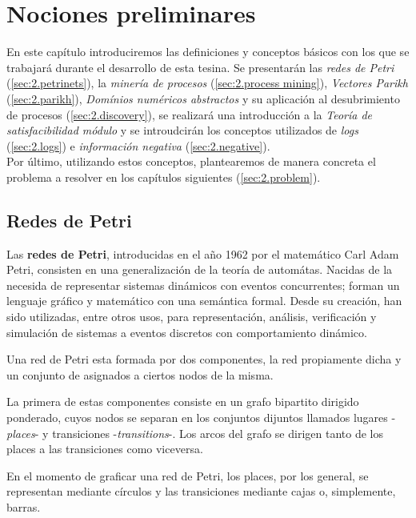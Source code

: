\chapter[Nociones preliminares]{Nociones preliminares}
\label{chap:2}

En este capítulo introduciremos las definiciones y conceptos básicos con los que se trabajará durante el desarrollo de 
esta tesina. Se presentarán las \textit{redes de Petri} (\autoref{sec:2.petrinets}), la \textit{minería de procesos} 
(\autoref{sec:2.process mining}), \textit{Vectores Parikh} (\autoref{sec:2.parikh}), \textit{Domínios numéricos abstractos}
y su aplicación al desubrimiento de procesos (\autoref{sec:2.discovery}), se realizará una introducción 
a la \textit{Teoría de satisfacibilidad módulo} y se introudcirán los conceptos utilizados de 
\textit{logs} (\autoref{sec:2.logs}) e \textit{información negativa} (\autoref{sec:2.negative}).
\\

Por último, utilizando estos conceptos, plantearemos de manera concreta el problema a resolver en los capítulos siguientes (\autoref{sec:2.problem}).

\section{Redes de Petri}
\label{sec:2.petrinets}
Las \textbf{redes de Petri}, introducidas en el año 1962 por el matemático
Carl Adam Petri, consisten en una generalización de la teoría de automátas.
Nacidas de la necesida de representar sistemas dinámicos con eventos concurrentes;
forman un lenguaje gráfico y matemático con una semántica formal.
Desde su creación, han sido utilizadas, entre otros usos, para representación,
análisis, verificación y simulación de sistemas a eventos discretos con comportamiento dinámico\cite{Murata89}.

Una red de Petri esta formada por dos componentes, la red propiamente dicha y un conjunto
de  asignados a ciertos nodos de la misma.

La primera de estas componentes consiste en un grafo bipartito dirigido ponderado,
cuyos nodos se separan en los conjuntos dijuntos 
llamados lugares -\textit{places}- y transiciones -\textit{transitions}-.
Los arcos del grafo se dirigen tanto de los places a las transiciones como viceversa.

En el momento de graficar una red de Petri, los places, por los general, se
representan mediante círculos y las transiciones mediante cajas o, simplemente, barras.

